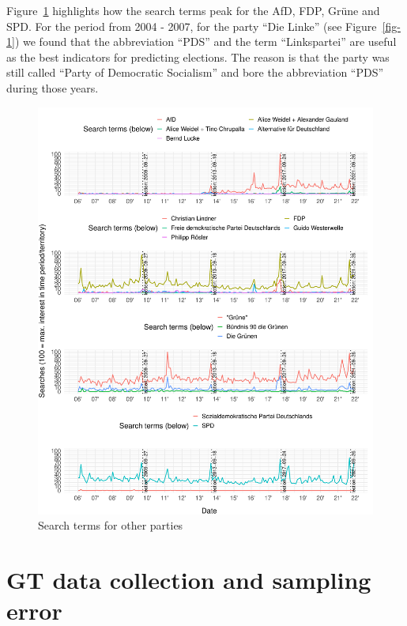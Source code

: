 \documentclass[
  letterpaper,
  DIV=11,
  numbers=noendperiod]{scrartcl}
\begin{document}
Figure~\ref{fig-A2} highlights how the search terms peak for the AfD,
FDP, Grüne and SPD. For the period from 2004 - 2007, for the party ``Die
Linke'' (see Figure~\ref{fig-1}) we found that the abbreviation ``PDS''
and the term ``Linkspartei'' are useful as the best indicators for
predicting elections. The reason is that the party was still called
``Party of Democratic Socialism'' and bore the abbreviation ``PDS''
during those years.

\begin{figure}[H]

\caption{\label{fig-A2}Search terms for other parties}

{\centering \includegraphics{figures/fig-A2-1.pdf}

}

\end{figure}

\hypertarget{sec-gtsampling}{%
\section{GT data collection and sampling error}\label{sec-gtsampling}}
\end{document}
